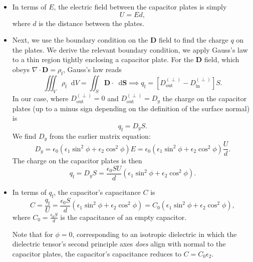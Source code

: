 \documentclass[11pt, a4paper]{article}
\newcommand{\diff}{\mathop{}\!\mathrm{d}} %
\renewcommand{\vec}[1]{\bm{#1}} %
\newcommand{\D}{\vec{D}}  %
\newcommand{\e}{\epsilon}
\newcommand{\ee}{\epsilon_{0}}  %
\renewcommand{\div}{\nabla \cdot}
\begin{document}
\begin{itemize}
	\item In terms of $ E $, the electric field between the capacitor plates is simply
	\begin{equation*}
		U = Ed,
	\end{equation*}
	where $ d $ is the distance between the plates. 
			
	\item Next, we use the boundary condition on the $ \D $ field to find the charge $ q $ on the plates. We derive the relevant boundary condition, we apply Gauss's law to a thin region tightly enclosing a capacitor plate. For the $ \D $ field, which obeys $ \div \D = \rho_{\text{f}} $, Gauss's law reads
	\begin{equation*}
		\iiint_{V} \rho_{\text{f}} \diff V = \iint_{S} \D \cdot \diff \vec{S} \implies q_{\text{f}} = \left[D_{\text{out}}^{(\perp)} - D_{\text{in}}^{(\perp)} \right] S.
	\end{equation*}
	In our case, where $ D_{\text{out}}^{(\perp)} = 0 $ and $ D_{\text{out}}^{(\perp)} = D_{y} $ the charge on the capacitor plates (up to a minus sign depending on the definition of the surface normal) is
	\begin{equation*}
		q_{\text{f}} = D_{y} S.
	\end{equation*}	
	We find $ D_{y} $ from the earlier matrix equation:
	\begin{equation*}
		D_{y} = \ee \left( \e_{1} \sin^{2}\phi + \e_{2} \cos^{2}\phi \right) E = \ee \left( \e_{1} \sin^{2}\phi + \e_{2} \cos^{2}\phi \right) \frac{U}{d}.
	\end{equation*}
	The charge on the capacitor plates is then
	\begin{equation*}
		q_{\text{f}} = D_{y} S = \frac{\ee SU}{d} \left( \e_{1} \sin^{2}\phi + \e_{2} \cos^{2}\phi \right) .
	\end{equation*}
	
	\item In terms of $ q_{\text{f}} $, the capacitor's capacitance $ C $ is
	\begin{equation*}
		C = \frac{q_{\text{f}}}{U} = \frac{\ee S}{d}\left(\e_{1} \sin^{2}\phi + \e_{2} \cos^{2}\phi\right) = C_{0}\left(\e_{1} \sin^{2}\phi + \e_{2} \cos^{2}\phi\right),
	\end{equation*}
	where $ C_{0} =  \frac{\ee S}{d} $ is the capacitance of an empty capacitor. 
	
	Note that for $ \phi = 0 $, corresponding to an isotropic dielectric in which the dielectric tensor's second principle axes \textit{does} align with normal to the capacitor plates, the capacitor's capacitance reduces to $ C = C_{0}\e_{2} $. 
\end{itemize}
\end{document}

